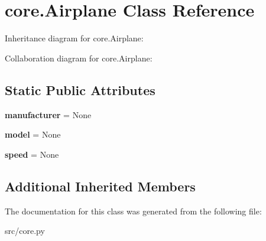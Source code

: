 \hypertarget{classcore_1_1_airplane}{}\section{core.\+Airplane Class Reference}
\label{classcore_1_1_airplane}


Inheritance diagram for core.\+Airplane\+:


Collaboration diagram for core.\+Airplane\+:
\subsection*{Static Public Attributes}
\begin{DoxyCompactItemize}
\item 
\mbox{\label{classcore_1_1_airplane_a5bdbfc412788ae5d411e55cebd0eafd8}} 
{\bfseries manufacturer} = None
\item 
\mbox{\label{classcore_1_1_airplane_ab77dd3b714d0d1c0adb18befaecd3e76}} 
{\bfseries model} = None
\item 
\mbox{\label{classcore_1_1_airplane_afd8346b9be66e74cffb6ec95813f279e}} 
{\bfseries speed} = None
\end{DoxyCompactItemize}
\subsection*{Additional Inherited Members}


The documentation for this class was generated from the following file\+:\begin{DoxyCompactItemize}
\item 
src/core.\+py\end{DoxyCompactItemize}
